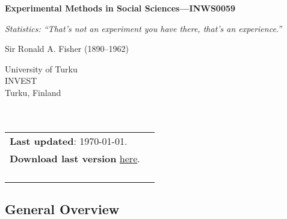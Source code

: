 \documentclass[letterpaper]{article}
\def\name{Experimental Methods in Social Sciences---INWS0059}
\begin{document}

\centerline{\huge \bf \name}

\epigraph{\emph{Statistics: ``That's not an experiment you have there, that’s an experience.''}}{Sir Ronald A. Fisher (1890–1962)}


\vspace{0.25in}

\begin{minipage}{0.45\linewidth}
 University of Turku \\
  INVEST \\
  Turku, Finland\\
  \\
  \\

\end{minipage}
\hspace{4cm}\begin{minipage}{0.45\linewidth}
  \begin{tabular}{ll}
{\bf Last updated}: \today. \\
 {\bf Download last version} \href{https://github.com/hbahamonde/Exp_Soc_Science/raw/main/Bahamonde_Exp_Soc_Sci.pdf}{here}.%
    \\
    \\
    \\
    \\
    \\
  \end{tabular}
\end{minipage}

\subsection*{General Overview}
\end{document}
